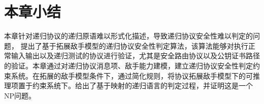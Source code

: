 








\section{本章小结}

本章针对递归协议的递归原语难以形式化描述，导致递归协议安全性难以判定的问题，
提出了基于拓展敌手模型的递归协议安全性判定算法，该算法能够对执行正常输入输出以及递归测试的协议进行验证，尤其是安全路由协议以及公钥证书路径的验证。本章通过对递归协议消息项、敌手能力建模，建立递归协议安全性判定约束系统。在拓展的敌手模型条件下，通过简化规则，将协议拓展敌手模型下的可推理项置于约束系统下。给出了基于映射的递归语言的判定过程，并证明这是一个NP问题。
